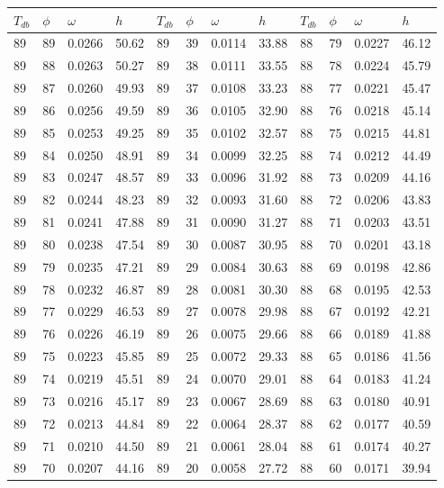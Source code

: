 \begin{tabular}{llll|llll|llll}
 \toprule 
\(T_{db}\) & \(\phi\) & \(\omega\) & \(h\) & \(T_{db}\) & \(\phi\) & \(\omega\) & \(h\) & \(T_{db}\) & \(\phi\) & \(\omega\) & \(h\)  \\ \midrule 
89 & 89 & 0.0266 & 50.62 & 89 & 39 & 0.0114 & 33.88 & 88 & 79 & 0.0227 & 46.12\\
89 & 88 & 0.0263 & 50.27 & 89 & 38 & 0.0111 & 33.55 & 88 & 78 & 0.0224 & 45.79\\
89 & 87 & 0.0260 & 49.93 & 89 & 37 & 0.0108 & 33.23 & 88 & 77 & 0.0221 & 45.47\\
89 & 86 & 0.0256 & 49.59 & 89 & 36 & 0.0105 & 32.90 & 88 & 76 & 0.0218 & 45.14\\
89 & 85 & 0.0253 & 49.25 & 89 & 35 & 0.0102 & 32.57 & 88 & 75 & 0.0215 & 44.81\\
89 & 84 & 0.0250 & 48.91 & 89 & 34 & 0.0099 & 32.25 & 88 & 74 & 0.0212 & 44.49\\
89 & 83 & 0.0247 & 48.57 & 89 & 33 & 0.0096 & 31.92 & 88 & 73 & 0.0209 & 44.16\\
89 & 82 & 0.0244 & 48.23 & 89 & 32 & 0.0093 & 31.60 & 88 & 72 & 0.0206 & 43.83\\
89 & 81 & 0.0241 & 47.88 & 89 & 31 & 0.0090 & 31.27 & 88 & 71 & 0.0203 & 43.51\\
89 & 80 & 0.0238 & 47.54 & 89 & 30 & 0.0087 & 30.95 & 88 & 70 & 0.0201 & 43.18\\
89 & 79 & 0.0235 & 47.21 & 89 & 29 & 0.0084 & 30.63 & 88 & 69 & 0.0198 & 42.86\\
89 & 78 & 0.0232 & 46.87 & 89 & 28 & 0.0081 & 30.30 & 88 & 68 & 0.0195 & 42.53\\
89 & 77 & 0.0229 & 46.53 & 89 & 27 & 0.0078 & 29.98 & 88 & 67 & 0.0192 & 42.21\\
89 & 76 & 0.0226 & 46.19 & 89 & 26 & 0.0075 & 29.66 & 88 & 66 & 0.0189 & 41.88\\
89 & 75 & 0.0223 & 45.85 & 89 & 25 & 0.0072 & 29.33 & 88 & 65 & 0.0186 & 41.56\\
89 & 74 & 0.0219 & 45.51 & 89 & 24 & 0.0070 & 29.01 & 88 & 64 & 0.0183 & 41.24\\
89 & 73 & 0.0216 & 45.17 & 89 & 23 & 0.0067 & 28.69 & 88 & 63 & 0.0180 & 40.91\\
89 & 72 & 0.0213 & 44.84 & 89 & 22 & 0.0064 & 28.37 & 88 & 62 & 0.0177 & 40.59\\
89 & 71 & 0.0210 & 44.50 & 89 & 21 & 0.0061 & 28.04 & 88 & 61 & 0.0174 & 40.27\\
89 & 70 & 0.0207 & 44.16 & 89 & 20 & 0.0058 & 27.72 & 88 & 60 & 0.0171 & 39.94\\

\end{tabular}
